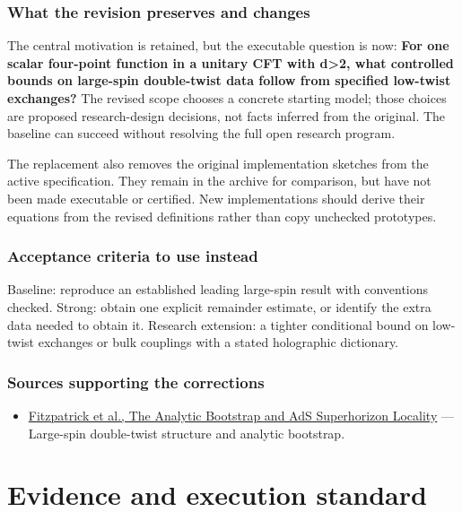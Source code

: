 \documentclass[
  11pt,
]{article}
\providecommand{\tightlist}{%
  \setlength{\itemsep}{0pt}\setlength{\parskip}{0pt}}
\begin{document}
\subsubsection{What the revision preserves and changes}

The central motivation is retained, but the executable question is now:
\textbf{For one scalar four-point function in a unitary CFT with
d\textgreater2, what controlled bounds on large-spin double-twist data
follow from specified low-twist exchanges?} The revised scope chooses a
concrete starting model; those choices are proposed research-design
decisions, not facts inferred from the original. The baseline can
succeed without resolving the full open research program.

The replacement also removes the original implementation sketches from
the active specification. They remain in the archive for comparison, but
have not been made executable or certified. New implementations should
derive their equations from the revised definitions rather than copy
unchecked prototypes.

\subsubsection{Acceptance criteria to use instead}

Baseline: reproduce an established leading large-spin result with
conventions checked. Strong: obtain one explicit remainder estimate, or
identify the extra data needed to obtain it. Research extension: a
tighter conditional bound on low-twist exchanges or bulk couplings with
a stated holographic dictionary.

\subsubsection{Sources supporting the corrections}

\begin{itemize}
\tightlist
\item
  \href{https://arxiv.org/abs/1212.3616}{Fitzpatrick et al., The
  Analytic Bootstrap and AdS Superhorizon Locality} --- Large-spin
  double-twist structure and analytic bootstrap.
\end{itemize}

\section{Evidence and execution standard}
\end{document}
